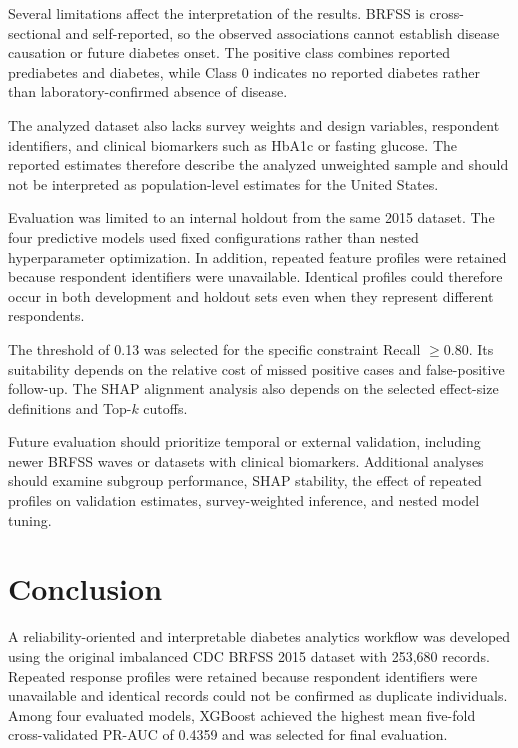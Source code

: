 \documentclass[pdflatex,sn-basic,Numbered]{sn-jnl}
\begin{document}
Several limitations affect the interpretation of the results.
BRFSS is cross-sectional and self-reported, so the observed associations
cannot establish disease causation or future diabetes onset.
The positive class combines reported prediabetes and diabetes, while
Class 0 indicates no reported diabetes rather than laboratory-confirmed
absence of disease.

The analyzed dataset also lacks survey weights and design variables,
respondent identifiers, and clinical biomarkers such as HbA1c or fasting
glucose.
The reported estimates therefore describe the analyzed unweighted sample
and should not be interpreted as population-level estimates for the United
States.

Evaluation was limited to an internal holdout from the same 2015 dataset.
The four predictive models used fixed configurations rather than nested
hyperparameter optimization.
In addition, repeated feature profiles were retained because respondent
identifiers were unavailable.
Identical profiles could therefore occur in both development and holdout
sets even when they represent different respondents.

The threshold of 0.13 was selected for the specific constraint
Recall $\geq 0.80$.
Its suitability depends on the relative cost of missed positive cases and
false-positive follow-up.
The SHAP alignment analysis also depends on the selected effect-size
definitions and Top-$k$ cutoffs.

Future evaluation should prioritize temporal or external validation,
including newer BRFSS waves or datasets with clinical biomarkers.
Additional analyses should examine subgroup performance, SHAP stability,
the effect of repeated profiles on validation estimates, survey-weighted
inference, and nested model tuning.

\section{Conclusion}\label{sec:conclusion}

A reliability-oriented and interpretable diabetes analytics workflow was developed using the original imbalanced CDC BRFSS 2015 dataset with 253,680 records. Repeated response profiles were retained because respondent identifiers were unavailable and identical records could not be confirmed as duplicate individuals. Among four evaluated models, XGBoost achieved the highest mean five-fold cross-validated PR-AUC of 0.4359 and was selected for final evaluation.
\end{document}
